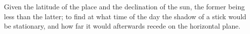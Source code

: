 Given the latitude of the place and the declination of the sun,
the former being less than the latter; to find at what time of 
the day the shadow of a stick would be stationary, and how far 
it would afterwards recede on the horizontal plane.
